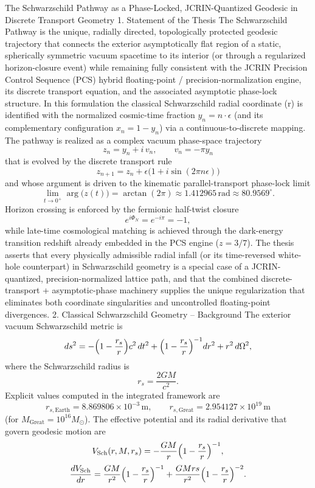 The Schwarzschild Pathway as a Phase-Locked, JCRIN-Quantized Geodesic in Discrete Transport Geometry
1. Statement of the Thesis
The Schwarzschild Pathway is the unique, radially directed, topologically protected geodesic trajectory that connects the exterior asymptotically flat region of a static, spherically symmetric vacuum spacetime to its interior (or through a regularized horizon-closure event) while remaining fully consistent with the JCRIN Precision Control Sequence (PCS) hybrid floating-point / precision-normalization engine, its discrete transport equation, and the associated asymptotic phase-lock structure.
In this formulation the classical Schwarzschild radial coordinate (r) is identified with the normalized cosmic-time fraction \(y_n = n\cdot\epsilon\) (and its complementary configuration \(x_n = 1 - y_n\)) via a continuous-to-discrete mapping. The pathway is realized as a complex vacuum phase-space trajectory
\[
z_n = y_n + i\,v_n, \qquad v_n = -\pi y_n
\]
that is evolved by the discrete transport rule
\[
z_{n+1} = z_n + \epsilon\bigl(1 + i\sin(2\pi n\epsilon)\bigr)
\]
and whose argument is driven to the kinematic parallel-transport phase-lock limit
\[
\lim_{t\to 0^+}\arg\bigl(z(t)\bigr) = \arctan(2\pi) \approx 1.412965\,\text{rad} \approx 80.9569^\circ.
\]
Horizon crossing is enforced by the fermionic half-twist closure
\[
e^{i\Phi_N} = e^{-i\pi} = -1,
\]
while late-time cosmological matching is achieved through the dark-energy transition redshift already embedded in the PCS engine (\(z = 3/7\)).
The thesis asserts that every physically admissible radial infall (or its time-reversed white-hole counterpart) in Schwarzschild geometry is a special case of a JCRIN-quantized, precision-normalized lattice path, and that the combined discrete-transport + asymptotic-phase machinery supplies the unique regularization that eliminates both coordinate singularities and uncontrolled floating-point divergences.
2. Classical Schwarzschild Geometry – Background
The exterior vacuum Schwarzschild metric is
\[
ds^2 = -\Bigl(1 - \frac{r_s}{r}\Bigr)c^2\,dt^2 + \Bigl(1 - \frac{r_s}{r}\Bigr)^{-1}dr^2 + r^2\,d\Omega^2,
\]
where the Schwarzschild radius is
\[
r_s = \frac{2GM}{c^2}.
\]
Explicit values computed in the integrated framework are
\[
r_{s,\text{Earth}} = 8.869806\times 10^{-3}\,\text{m}, \qquad
r_{s,\text{Great}} = 2.954127\times 10^{19}\,\text{m}
\]
(for \(M_{\text{Great}} = 10^{16}M_\odot\)).
The effective potential and its radial derivative that govern geodesic motion are
\[
V_{\rm Sch}(r,M,r_s) = -\frac{GM}{r}\Bigl(1 - \frac{r_s}{r}\Bigr)^{-1},
\]
\[
\frac{dV_{\rm Sch}}{dr} = \frac{GM}{r^2}\Bigl(1 - \frac{r_s}{r}\Bigr)^{-1} + \frac{GMrs}{r^2}\Bigl(1 - \frac{r_s}{r}\Bigr)^{-2}.
\]
